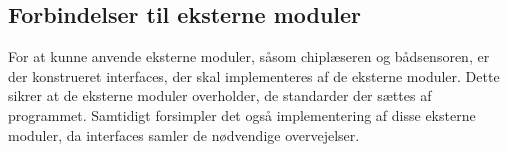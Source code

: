 \subsection{Forbindelser til eksterne moduler}

For at kunne anvende eksterne moduler, såsom chiplæseren og bådsensoren, er der konstrueret interfaces, der skal implementeres af de eksterne moduler. Dette sikrer at de eksterne moduler overholder, de standarder der sættes af programmet. Samtidigt forsimpler det også implementering af disse eksterne moduler, da interfaces samler de nødvendige overvejelser.